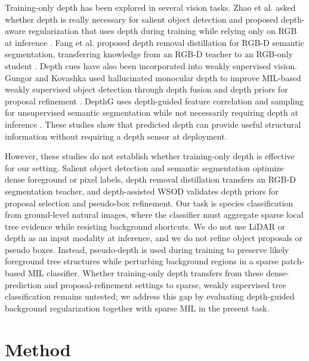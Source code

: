 \documentclass{ieeeaccess}
\begin{document}
Training-only depth has been explored in several vision tasks. Zhao et al. asked whether depth is
really necessary for salient object detection and proposed depth-aware regularization that uses
depth during training while relying only on RGB at inference \cite{depthsod}. Fang et al. proposed
depth removal distillation for RGB-D semantic segmentation, transferring knowledge from an RGB-D
teacher to an RGB-only student \cite{depthremoval}. Depth cues have also been incorporated into
weakly supervised vision. Gungor and Kovashka used hallucinated monocular depth to improve MIL-based
weakly supervised object detection through depth fusion and depth priors for proposal refinement
\cite{wsoddepth}. DepthG uses depth-guided feature correlation and sampling for unsupervised
semantic segmentation while not necessarily requiring depth at inference \cite{depthg}. These
studies show that predicted depth can provide useful structural information without requiring a
depth sensor at deployment.

However, these studies do not establish whether training-only depth is effective for our setting.
Salient object detection and semantic segmentation optimize dense foreground or pixel labels, depth
removal distillation transfers an RGB-D segmentation teacher, and depth-assisted WSOD validates
depth priors for proposal selection and pseudo-box refinement. Our task is species classification
from ground-level natural images, where the classifier must aggregate sparse local tree evidence
while resisting background shortcuts. We do not use LiDAR or depth as an input modality at
inference, and we do not refine object proposals or pseudo boxes. Instead, pseudo-depth is used
during training to preserve likely foreground tree structures while perturbing background regions in
a sparse patch-based MIL classifier. Whether training-only depth transfers from these
dense-prediction and proposal-refinement settings to sparse, weakly supervised tree classification
remains untested; we address this gap by evaluating depth-guided background regularization together
with sparse MIL in the present task.

\section{Method}
\label{sec:method}
\end{document}
